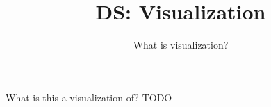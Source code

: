 \documentclass[aspectratio=169]{../latex_main/tntbeamer}  %
\title[Visualization]{DS: Visualization}
\subtitle{What is visualization?}
\begin{document}
	
	\maketitle
	\begin{frame}{What is this a visualization of?}
	    \centering
	    TODO
	\end{frame}
	

	
	
\end{document}
